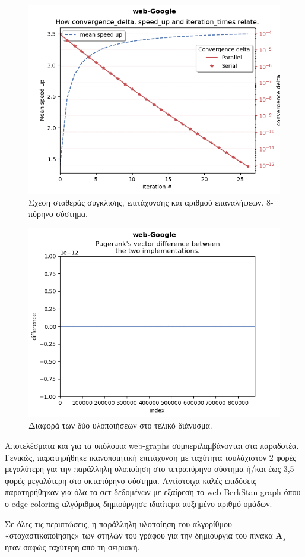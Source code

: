 \begin{center}
\begin{figure}
\includegraphics[width=\linewidth]{plots/speed_up_diades.png}
\caption{Σχέση σταθεράς σύγκλισης, επιτάχυνσης και αριθμού επαναλήψεων. 8-πύρηνο σύστημα.}
\label{fig:relatd}
\end{figure}

\begin{figure}
\includegraphics[width=\linewidth]{plots/diff.png}
\caption{Διαφορά των δύο υλοποιήσεων στο τελικό διάνυσμα.}
\label{fig:dif}
\end{figure}

\end{center}


Αποτελέσματα και για τα υπόλοιπα web-graphs συμπεριλαμβάνονται στα παραδοτέα. Γενικώς, παρατηρήθηκε ικανοποιητική επιτάχυνση με ταχύτητα τουλάχιστον 2 φορές μεγαλύτερη για την παράλληλη υλοποίηση στο τετραπύρηνο σύστημα ή/και έως 3,5 φορές μεγαλύτερη στο οκταπύρηνο σύστημα. Αντίστοιχα καλές επιδόσεις παρατηρήθηκαν για όλα τα σετ δεδομένων με εξαίρεση το web-BerkStan graph όπου ο edge-coloring αλγόριθμος δημιούργησε ιδιαίτερα αυξημένο αριθμό ομάδων.

Σε όλες τις περιπτώσεις, η παράλληλη υλοποίηση του αλγορίθμου «στοχαστικοποίησης» των στηλών του γράφου για την δημιουργία του πίνακα $\bm{A}_s$ ήταν σαφώς ταχύτερη από τη σειριακή.
